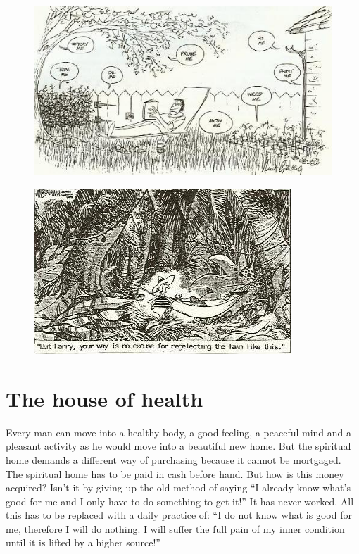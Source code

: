 \documentclass[12pt,letterpaper]{article}
\begin{document}
\begin{figure} \centering
  \includegraphics[width=\textwidth]{p28a.jpg}
\end{figure}

\begin{figure} \centering
  \includegraphics[width=\textwidth]{p28b.jpg}
\end{figure}

\section{The house of health}
\label{sec:thoh}

Every man can move into a healthy body, a good feeling, a peaceful
mind and a pleasant activity as he would move into a beautiful new
home. But the spiritual home demands a different way of purchasing
because it cannot be mortgaged. The spiritual home has to be paid in
cash before hand. But how is this money acquired? Isn't it by giving
up the old method of saying ``I already know what's good for me and I
only have to do something to get it!'' It has never worked. All this
has to be replaced with a daily practice of: ``I do not know what is
good for me, therefore I will do nothing. I will suffer the full pain
of my inner condition until it is lifted by a higher source!''
\end{document}
